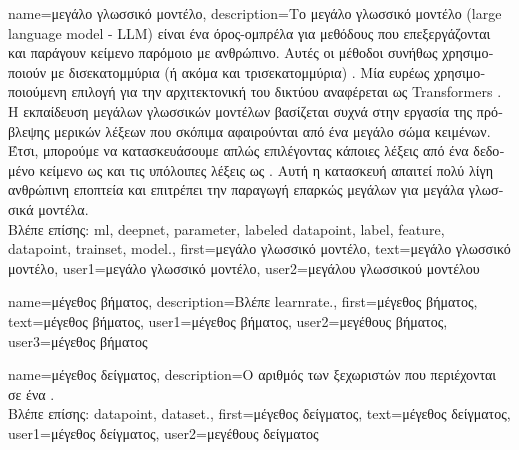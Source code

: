 {name={\foreignlanguage{greek}{μεγάλο γλωσσικό μοντέλο}},
	description={\foreignlanguage{greek}{Το μεγάλο γλωσσικό μοντέλο} 
		(large language model - LLM) \foreignlanguage{greek}{είναι ένα όρος-ομπρέλα για μεθόδους}  \foreignlanguage{greek}{που 
		επεξεργάζονται και παράγουν κείμενο παρόμοιο με ανθρώπινο. Αυτές οι μέθοδοι συνήθως χρησιμοποιούν} 
		 \foreignlanguage{greek}{με δισεκατομμύρια (ή ακόμα και τρισεκατομμύρια)} . 
		\foreignlanguage{greek}{Μία ευρέως χρησιμοποιούμενη επιλογή για την αρχιτεκτονική του δικτύου αναφέρεται ως} Transformers 
		\cite{vaswani2017attention}. \foreignlanguage{greek}{Η εκπαίδευση μεγάλων γλωσσικών μοντέλων βασίζεται συχνά στην εργασία της πρόβλεψης 
		μερικών λέξεων που σκόπιμα αφαιρούνται από ένα μεγάλο σώμα κειμένων. Έτσι, μπορούμε να κατασκευάσουμε}  
		\foreignlanguage{greek}{απλώς επιλέγοντας κάποιες λέξεις από ένα δεδομένο κείμενο ως}  \foreignlanguage{greek}{και τις υπόλοιπες 
		λέξεις ως}  . \foreignlanguage{greek}{Αυτή η κατασκευή απαιτεί πολύ λίγη ανθρώπινη εποπτεία 
		και επιτρέπει την παραγωγή επαρκώς μεγάλων}  \foreignlanguage{greek}{για μεγάλα γλωσσικά μοντέλα.} \\
		\foreignlanguage{greek}{Βλέπε επίσης:} \gls{ml}, \gls{deepnet}, \gls{parameter}, \gls{labeled datapoint}, \gls{label}, \gls{feature}, 
		\gls{datapoint}, \gls{trainset}, \gls{model}.},
	first={\foreignlanguage{greek}{μεγάλο γλωσσικό μοντέλο}},
	text={\foreignlanguage{greek}{μεγάλο γλωσσικό μοντέλο}},
	user1={\foreignlanguage{greek}{μεγάλο γλωσσικό μοντέλο}}, %
	user2={\foreignlanguage{greek}{μεγάλου γλωσσικού μοντέλου}} %
}

{name={\foreignlanguage{greek}{μέγεθος βήματος}}, 
	description={\foreignlanguage{greek}{Βλέπε} \gls{learnrate}.}, 
	first={\foreignlanguage{greek}{μέγεθος βήματος}},
	text={\foreignlanguage{greek}{μέγεθος βήματος}},
	user1={\foreignlanguage{greek}{μέγεθος βήματος}}, %
  	user2={\foreignlanguage{greek}{μεγέθους βήματος}}, %
	user3={\foreignlanguage{greek}{μέγεθος βήματος}} %
}

{name={\foreignlanguage{greek}{μέγεθος δείγματος}},
	description={\foreignlanguage{greek}{Ο} 
		\foreignlanguage{greek}{αριθμός των ξεχωριστών}  \foreignlanguage{greek}{που περιέχονται 
		σε ένα} .\\
		\foreignlanguage{greek}{Βλέπε επίσης:} \gls{datapoint}, \gls{dataset}.},
	first={\foreignlanguage{greek}{μέγεθος δείγματος}},
	text={\foreignlanguage{greek}{μέγεθος δείγματος}},
	user1={\foreignlanguage{greek}{μέγεθος δείγματος}}, %
	user2={\foreignlanguage{greek}{μεγέθους δείγματος}} %
}

